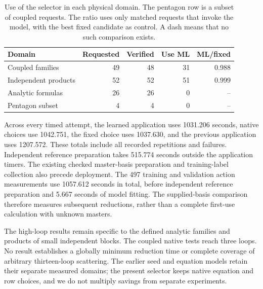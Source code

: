 \begin{table}[!htbp]\centering\small
\caption{Use of the selector in each physical domain. The pentagon row is a subset of coupled requests. The ratio uses only matched requests that invoke the model, with the best fixed candidate as control. A dash means that no such comparison exists.}
\label{tab:total-domains}
\begin{tabularx}{\linewidth}{@{}Yrrrr@{}}\toprule
Domain & Requested & Verified & Use ML & ML/fixed\\\midrule
Coupled families & 49 & 48 & 31 & 0.988\\
Independent products & 52 & 52 & 51 & 0.999\\
Analytic formulas & 26 & 26 & 0 & --\\
Pentagon subset & 4 & 4 & 0 & --\\
\bottomrule\end{tabularx}\end{table}

Across every timed attempt, the learned application uses 1031.206 seconds, native choices use 1042.751, the fixed choice uses 1037.630, and the previous application uses 1207.572. These totals include all recorded repetitions and failures. Independent reference preparation takes 515.774 seconds outside the application timers. The existing checked master-basis preparation and training-label collection also precede deployment. The 497 training and validation action measurements use 1057.612 seconds in total, before independent reference preparation and 5.667 seconds of model fitting. The supplied-basis comparison therefore measures subsequent reductions, rather than a complete first-use calculation with unknown masters.

The high-loop results remain specific to the defined analytic families and products of small independent blocks. The coupled native tests reach three loops. No result establishes a globally minimum reduction time or complete coverage of arbitrary thirteen-loop scattering. The earlier seed and equation models retain their separate measured domains; the present selector keeps native equation and row choices, and we do not multiply savings from separate experiments.
